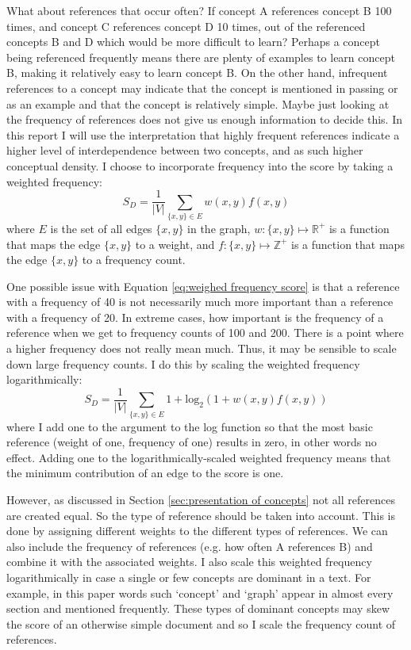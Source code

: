 \documentclass[12pt]{article}
\begin{document}
What about references that occur often? If concept A references concept B 100 times, and concept C references concept D 10 times, out of the referenced concepts B and D which would be more difficult to learn? Perhaps a concept being referenced frequently means there are plenty of examples to learn concept B, making it relatively easy to learn concept B. On the other hand, infrequent references to a concept may indicate that the concept is mentioned in passing or as an example and that the concept is relatively simple. Maybe just looking at the frequency of references does not give us enough information to decide this. In this report I will use the interpretation that highly frequent references indicate a higher level of interdependence between two concepts, and as such higher conceptual density. I choose to incorporate frequency into the score by taking a weighted frequency:
\begin{equation} \label{eq:weighed frequency score}
    S_D = \frac{1}{|V|} \sum_{\{x, y\} \in E} w(x, y) f(x, y)
\end{equation}
where $E$ is the set of all edges $\{x, y\} $ in the graph, $w: \{x, y\} \mapsto \mathbb{R}^+$ is a function that maps the edge $\{x, y\}$ to a weight, and $f: \{x, y\} \mapsto \mathbb{Z}^+$ is a function that maps the edge $\{x, y\}$ to a frequency count.

One possible issue with Equation \ref{eq:weighed frequency score} is that a reference with a frequency of 40 is not necessarily much more important than a reference with a frequency of 20. In extreme cases, how important is the frequency of a reference when we get to frequency counts of  100 and 200. There is a point where a higher frequency does not really mean much. Thus, it may be sensible to scale down large frequency counts. I do this by scaling the weighted frequency logarithmically: 
\begin{equation} \label{eq:log weighed frequency score}
    S_D = \frac{1}{|V|} \sum_{\{x, y\} \in E} 1 + \text{log}_2 (1 + w(x, y) f(x, y))
\end{equation}
where I add one to the argument to the log function so that the most basic reference (weight of one, frequency of one) results in zero, in other words no effect. Adding one to the logarithmically-scaled weighted frequency means that the minimum contribution of an edge to the score is one.

However, as discussed in Section \ref{sec:presentation of concepts} not all references are created equal. So the type of reference should be taken into account. This is done by assigning different weights to the different types of references. We can also include the frequency of references (e.g. how often A references B) and combine it with the associated weights. I also scale this weighted frequency logarithmically in case a single or few concepts are dominant in a text. For example, in this paper words such `concept' and `graph' appear in almost every section and mentioned frequently. These types of dominant concepts may skew the score of an otherwise simple document and so I scale the frequency count of references.
\end{document}
